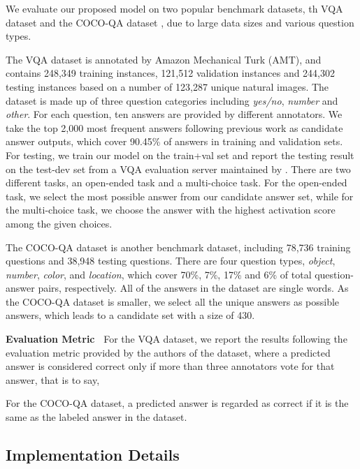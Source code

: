 \documentclass[sigconf]{acmart}
\begin{document}
We evaluate our proposed model on two popular benchmark datasets, th VQA dataset \cite{antol2015vqa} and the COCO-QA dataset \cite{ren2015exploring}, due to large data sizes and various question types. 

The VQA dataset is annotated by Amazon Mechanical Turk (AMT), and  contains 248,349 training instances, 121,512 validation instances and 244,302 testing instances based on a number of 123,287 unique natural images. The dataset is made up of three question categories including \textit{yes/no}, \textit{number} and \textit{other}. For each question, ten answers are provided by different annotators. We take the top 2,000 most frequent answers following previous work \cite{kim2016hadamard} as candidate answer outputs, which cover 90.45\% of answers in training and validation sets. For testing, we train our model on the train+val set and report the testing result on the test-dev set from a VQA evaluation server maintained by \cite{antol2015vqa}. There are two different tasks, an open-ended task and a multi-choice task. For the open-ended task, we select the most possible answer from our candidate answer set, while for the multi-choice task, we choose the answer with the highest activation score among the given choices.

The COCO-QA dataset is another benchmark dataset, including 78,736 training questions and 38,948 testing questions. There are four question types, \textit{object}, \textit{number}, \textit{color}, and \textit{location}, which cover 70\%, 7\%, 17\% and 6\% of total question-answer pairs, respectively. All of the answers in the dataset are single words. As the COCO-QA dataset is smaller, we select all the unique answers as possible answers, which leads to a candidate set with a size of 430.


\textbf{Evaluation Metric~} 
For the VQA dataset, we report the results following the evaluation metric provided by the authors of the dataset, where a predicted answer is considered correct only if more than three annotators vote for that answer, that is to say, 

For the COCO-QA dataset, a predicted answer is regarded as correct if it is the same as the labeled answer in the dataset.




\subsection{Implementation Details}
\end{document}
